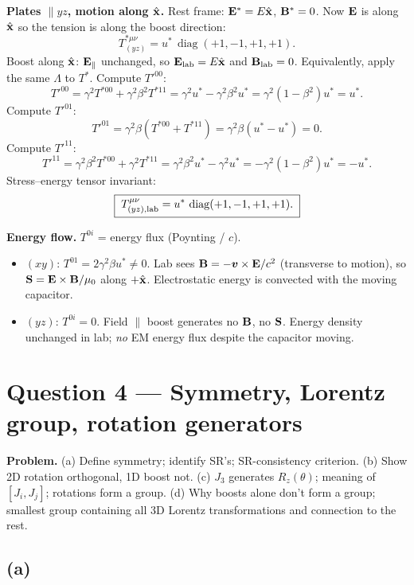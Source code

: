 \documentclass[11pt]{article}
\DeclareMathOperator{\diag}{diag}
\begin{document}
\textbf{Plates $\parallel yz$, motion along $\hat{\vb x}$.} Rest frame: $\vb E^*=E\hat{\vb x}$, $\vb B^*=0$. Now $\vb E$ is along $\hat{\vb x}$ so the tension is along the boost direction:
\[ T^{*\mu\nu}_{(yz)} = u^*\,\diag(+1,-1,+1,+1). \]
Boost along $\hat{\vb x}$: $\vb E_\parallel$ unchanged, so $\vb E_{\rm lab} = E\hat{\vb x}$ and $\vb B_{\rm lab}=0$. Equivalently, apply the same $\Lambda$ to $T^*$. Compute $T'^{00}$:
\[ T'^{00} = \gamma^2 T^{*00} + \gamma^2\beta^2 T^{*11} = \gamma^2 u^* - \gamma^2\beta^2 u^* = \gamma^2(1-\beta^2)u^* = u^*. \]
Compute $T'^{01}$:
\[ T'^{01} = \gamma^2\beta(T^{*00} + T^{*11}) = \gamma^2\beta(u^* - u^*) = 0. \]
Compute $T'^{11}$:
\[ T'^{11} = \gamma^2\beta^2 T^{*00} + \gamma^2 T^{*11} = \gamma^2\beta^2 u^* - \gamma^2 u^* = -\gamma^2(1-\beta^2)u^* = -u^*. \]
Stress--energy tensor invariant:
\begin{equation}
\boxed{\;T^{\mu\nu}_{(yz),\rm lab} = u^*\,\diag(+1,-1,+1,+1).\;}
\end{equation}

\textbf{Energy flow.} $T^{0i}$ = energy flux (Poynting / $c$).
\begin{itemize}
\item $(xy)$: $T^{01}=2\gamma^2\beta u^*\neq 0$. Lab sees $\vb B = -\bm v\times\vb E/c^2$ (transverse to motion), so $\vb S=\vb E\times\vb B/\mu_0$ along $+\hat{\vb x}$. Electrostatic energy is convected with the moving capacitor.
\item $(yz)$: $T^{0i}=0$. Field $\parallel$ boost generates no $\vb B$, no $\vb S$. Energy density unchanged in lab; \emph{no} EM energy flux despite the capacitor moving.
\end{itemize}

\section*{Question 4 --- Symmetry, Lorentz group, rotation generators}

\textbf{Problem.} (a) Define symmetry; identify SR's; SR-consistency criterion. (b) Show 2D rotation orthogonal, 1D boost not. (c) $J_3$ generates $R_z(\theta)$; meaning of $[J_i,J_j]$; rotations form a group. (d) Why boosts alone don't form a group; smallest group containing all 3D Lorentz transformations and connection to the rest.

\subsection*{(a)}
\end{document}
